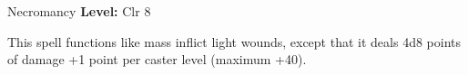 {Necromancy}
{
	\textbf{Level:}
	Clr 8\\
}
{
	This spell functions like mass inflict light wounds, except that it deals 4d8 points of damage +1 point per caster level (maximum +40).

}
